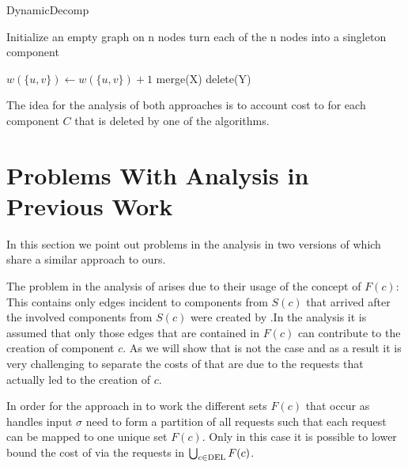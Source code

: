 \documentclass[a4paper,xcolor=dvipsnames, tikz, 12pt]{article}
\newcommand{\crep}{\text{C{\scriptsize REP}}}
\newcommand{\del}{\text{\scriptsize DEL}}
\newcommand{\opt}{\text{O{\scriptsize PT}}}
\theoremstyle{definition}
\begin{document}
	
	\begin{algorithm}
		\caption{DynamicDecomp}
		\label{highLevelAlg}
		\begin{algorithmic}
			\STATE Initialize an empty graph on n nodes
			\STATE turn each of the n nodes into a singleton component
			
			\STATE $w(\{u,v\})\gets w(\{u,v\})+1$
			\ENDIF
			\STATE merge(X)
			\ENDIF
			\STATE delete(Y)
			\ENDIF	
			
			\ENDFOR
			
		\end{algorithmic}
	\end{algorithm}
	
	The idea for the analysis of both approaches is to account cost to \opt{} for each component $C$ that is deleted by one of the algorithms.
	
	
	\section{Problems With Analysis in Previous Work}
	\label{flawsSection}
	In this section we point out problems in the analysis in two versions of \cite{Avin2015} which share a similar approach to ours.
	
	The problem in the analysis of \cite{Avin2015a} arises due to their usage of the concept of $F(c)$: This contains only edges incident to components from $S(c)$ that arrived after the involved components from $S(c)$ were created by \crep{}.In the analysis it is assumed that only those edges that are contained in $F(c)$ can contribute to the creation of component $c$. As we will show that is not the case and as a result it is very challenging to separate the costs of \opt{} that are due to the requests that actually led to the creation of $c$.
	
	In order for the approach in \cite{Avin2015a} to work the different sets $F(c)$ that occur as \crep{} handles input $\sigma$ need to form a partition of all requests such that each request can be mapped to one unique set $F(c)$. Only in this case it is possible to lower bound the cost of \crep{} via the requests in $\bigcup_{c\in\del{}}F(c)$.\
	
\end{document}
